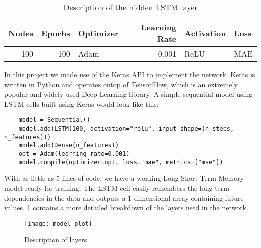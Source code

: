 \begin{table}[h]
    \centering
    \begin{tabular}{|r|r|l|r|l|l|}
        \hline
        \textbf{Nodes} & \textbf{Epochs} & \textbf{Optimizer} & \textbf{Learning Rate} & \textbf{Activation} & \textbf{Loss} \\ \hline
        100            & 100             & Adam               & 0.001                  & ReLU                & MAE           \\ \hline
        \end{tabular}
    \caption{Description of the hidden LSTM layer}
    \label{tab:lstm_layer}
\end{table}

In this project we made use of the Keras API to implement the network. Keras is written in Python and operates ontop of TensorFlow, which is an extremely popular and widely used Deep Learning library. A simple sequential model using LSTM cells built using Keras would look like this:

\begin{verbatim}
    model = Sequential()
    model.add(LSTM(100, activation="relu", input_shape=(n_steps, n_features)))
    model.add(Dense(n_features))
    opt = Adam(learning_rate=0.001)
    model.compile(optimizer=opt, loss="mae", metrics=["mse"])
\end{verbatim}

With as little as 5 lines of code, we have a working Long Short-Term Memory model ready for training. The LSTM cell easily remembers the long term dependencies in the data and outputs a 1-dimensional array containing future values. \ref{tab:layer_description} contains a more detailed breakdown of the layers used in the network.

\graphicspath{{./figures/}}
\begin{figure}[!ht]
    \centering
    \texttt{[image: model\_plot]}
    \caption{Description of layers}
    \label{tab:layer_description}
\end{figure}


